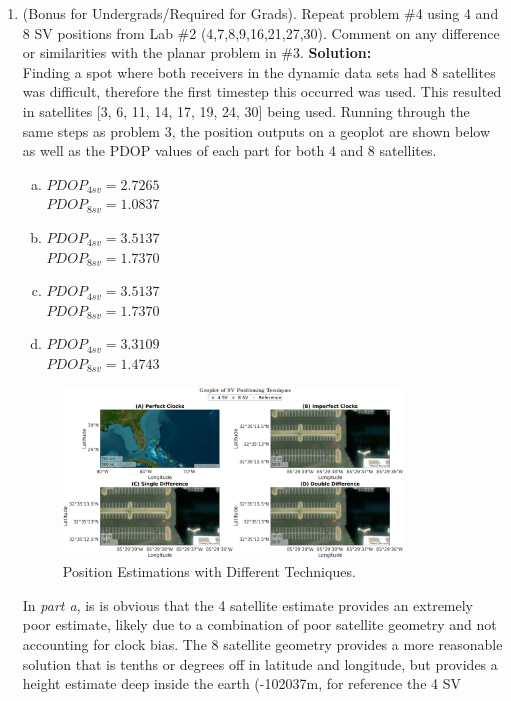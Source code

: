 \documentclass[11pt]{article}
\newcommand{\solution}{\textbf{Solution: \\}}
\begin{document}
\begin{enumerate}[label=\textbf{\arabic*.}]
  \vspace{24pt}
  \item (Bonus for Undergrads/Required for Grads). Repeat problem $\#$4 using 
  4 and 8 SV positions from Lab $\#$2 (4,7,8,9,16,21,27,30). Comment on any 
  difference or similarities with the planar problem in $\#$3.
  \solution
  Finding a spot where both receivers in the dynamic data sets had 8 satellites 
  was difficult, therefore the first timestep this occurred was used. This 
  resulted in satellites [3, 6, 11, 14, 17, 19, 24, 30] being used. Running 
  through the same steps as problem 3, the position outputs on a geoplot are 
  shown below as well as the PDOP values of each part for both 4 and 8 satellites.
  \begin{enumerate}[(a)]
    \itemsep -2pt
    \item $PDOP_{4sv} = 2.7265$ \\ $PDOP_{8sv} = 1.0837$
    \item $PDOP_{4sv} = 3.5137$ \\ $PDOP_{8sv} = 1.7370$
    \item $PDOP_{4sv} = 3.5137$ \\ $PDOP_{8sv} = 1.7370$
    \item $PDOP_{4sv} = 3.3109$ \\ $PDOP_{8sv} = 1.4743$
  \end{enumerate}
  \begin{figure}[H]
    \centering
    \includegraphics[width=0.85\textwidth]{5.png}
    \caption{Position Estimations with Different Techniques.}
  \end{figure}
  In \emph{part a}, is is obvious that the 4 satellite estimate provides an extremely 
  poor estimate, likely due to a combination of poor satellite geometry and not 
  accounting for clock bias. The 8 satellite geometry provides a more reasonable 
  solution that is tenths or degrees off in latitude and longitude, but provides 
  a height estimate deep inside the earth (-102037m, for reference the 4 SV 

\end{enumerate}
\end{document}
